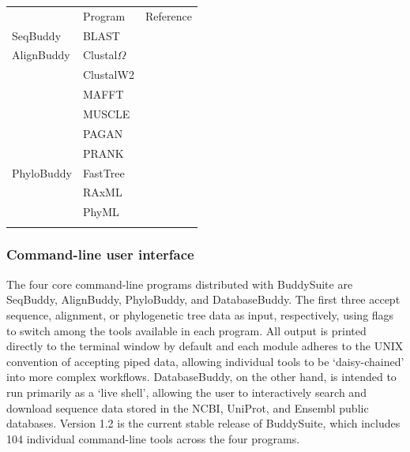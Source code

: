 \documentclass[nogrid]{MBE_article}%
\begin{document}
\begin{table}[!t]
      {\tabcolsep=5pt\begin{tabular}{@{\extracolsep{\fill}}lll@{}}
      \toprule
	   						& Program								& Reference
      \\\colrule
      SeqBuddy				& BLAST 								& \cite{Camacho2009}
      \\\colrule
      AlignBuddy			& Clustal$\Omega$						& \cite{Sievers:2011fn} \\
        					& ClustalW2 							& \cite{Larkin:2007hz} \\
							& MAFFT 								& \cite{Katoh:2013hm} \\
							& MUSCLE 								& \cite{Edgar:2004bo} \\
							& PAGAN 								& \cite{Loytynoja:2012fy} \\
        					& PRANK 								& \cite{Loytynoja:2005cb}		
      \\\colrule
      PhyloBuddy			& FastTree								& \cite{Price:2010eg} \\
        					& RAxML 								& \cite{Stamatakis:2006de} \\
        					& PhyML 								& \cite{Guindon:2010gf}
      \\\botrule
      \end{tabular}}
{}
\end{table}

\subsubsection{Command-line user interface}
The four core command-line programs distributed with BuddySuite are SeqBuddy, AlignBuddy, PhyloBuddy, and DatabaseBuddy. The first three accept sequence, alignment, or phylogenetic tree data as input, respectively, using flags to switch among the tools available in each program. All output is printed directly to the terminal window by default and each module adheres to the UNIX convention of accepting piped data, allowing individual tools to be `daisy-chained' into more complex workflows. DatabaseBuddy, on the other hand, is intended to run primarily as a `live shell', allowing the user to interactively search and download sequence data stored in the NCBI, UniProt, and Ensembl public databases. Version 1.2 is the current stable release of BuddySuite, which includes 104 individual command-line tools across the four programs.
\end{document}

